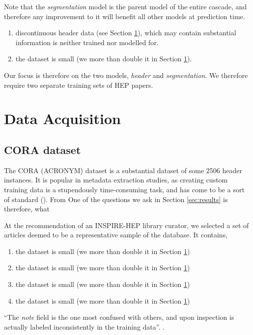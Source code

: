 Note that the \emph{segmentation} model is the parent model of the entire cascade, and therefore any improvement to it will benefit all other models at prediction time.

\begin{enumerate}

\item discontinuous header data (see Section \ref{sec:data}), which may contain substantial information is neither trained nor modelled for.
\item the dataset is small (we more than double it in Section \ref{sec:data}).
\end{enumerate}

Our focus is therefore on the two models, \emph{header} and \emph{segmentation}. We therefore require two separate training sets of HEP papers.

\section{Data Acquisition}
\label{sec:data}

\subsection{CORA dataset}
The CORA (ACRONYM) dataset is a substantial dataset of some 2506 header instances. It is popular in metadata extraction studies, as creating custom training data is a stupendously time-consuming task, and has come to be a sort of standard (\cite{Peng04accurateinformation}). From One of the questions we ask in Section \ref{sec:results} is therefore, what 

At the recommendation of an INSPIRE-HEP library curator, we selected a set of articles deemed to be a representative sample of the database. It contains,

\begin{enumerate}
\item the dataset is small (we more than double it in Section \ref{sec:data})
\item the dataset is small (we more than double it in Section \ref{sec:data})
\item the dataset is small (we more than double it in Section \ref{sec:data})
\item the dataset is small (we more than double it in Section \ref{sec:data})
\end{enumerate}

``The \emph{note} field is the one most confused with others, and upon inspection is actually labeled inconsistently in the training data''. \cite{Peng04accurateinformation}.

